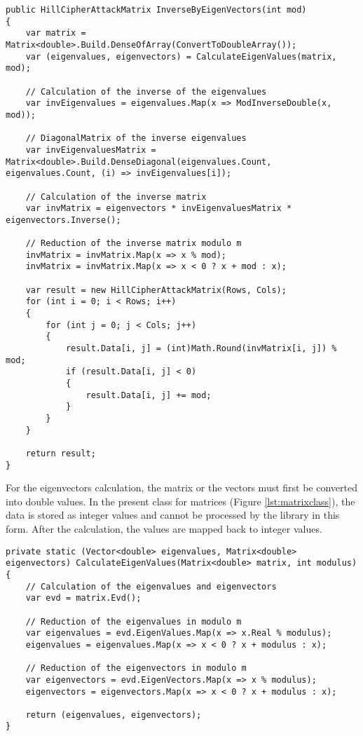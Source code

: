 \documentclass[conference]{IEEEtran}
\begin{document}
\begin{lstlisting}[caption={InverseByEigenVectors method}, label={lst:calcInverseEigenVec}]
public HillCipherAttackMatrix InverseByEigenVectors(int mod)
{
    var matrix = Matrix<double>.Build.DenseOfArray(ConvertToDoubleArray());
    var (eigenvalues, eigenvectors) = CalculateEigenValues(matrix, mod);

    // Calculation of the inverse of the eigenvalues
    var invEigenvalues = eigenvalues.Map(x => ModInverseDouble(x, mod));

    // DiagonalMatrix of the inverse eigenvalues
    var invEigenvaluesMatrix = Matrix<double>.Build.DenseDiagonal(eigenvalues.Count, eigenvalues.Count, (i) => invEigenvalues[i]);

    // Calculation of the inverse matrix
    var invMatrix = eigenvectors * invEigenvaluesMatrix * eigenvectors.Inverse();

    // Reduction of the inverse matrix modulo m
    invMatrix = invMatrix.Map(x => x % mod);
    invMatrix = invMatrix.Map(x => x < 0 ? x + mod : x);

    var result = new HillCipherAttackMatrix(Rows, Cols);
    for (int i = 0; i < Rows; i++)
    {
        for (int j = 0; j < Cols; j++)
        {
            result.Data[i, j] = (int)Math.Round(invMatrix[i, j]) % mod;
            if (result.Data[i, j] < 0)
            {
                result.Data[i, j] += mod;
            }
        }
    }

    return result;
}
\end{lstlisting}

For the eigenvectors calculation, the matrix or the vectors must first be converted into double values. In the present class for matrices (Figure \ref{lst:matrixclass}), the data is stored as integer values and cannot be processed by the library in this form. After the calculation, the values are mapped back to integer values.\\

\begin{lstlisting}[caption={CalculateEigenValues method}, label={lst:calcEigenVal}]
private static (Vector<double> eigenvalues, Matrix<double> eigenvectors) CalculateEigenValues(Matrix<double> matrix, int modulus)
{
    // Calculation of the eigenvalues and eigenvectors
    var evd = matrix.Evd();

    // Reduction of the eigenvalues in modulo m
    var eigenvalues = evd.EigenValues.Map(x => x.Real % modulus);
    eigenvalues = eigenvalues.Map(x => x < 0 ? x + modulus : x);

    // Reduction of the eigenvectors in modulo m
    var eigenvectors = evd.EigenVectors.Map(x => x % modulus);
    eigenvectors = eigenvectors.Map(x => x < 0 ? x + modulus : x);

    return (eigenvalues, eigenvectors);
}
\end{lstlisting}
\end{document}
